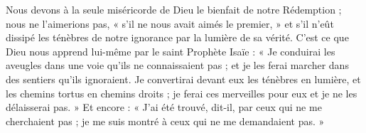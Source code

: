Nous devons à la seule miséricorde de Dieu le bienfait de notre Rédemption ; nous ne l’aimerions pas, « s’il ne nous avait aimés le premier, » et s’il n’eût dissipé les ténèbres de notre ignorance par la lumière de sa vérité. C’est ce que Dieu nous apprend lui-même par le saint Prophète Isaïe : « Je conduirai les aveugles dans une voie qu’ils ne connaissaient pas ; et je les ferai marcher dans des sentiers qu’ils ignoraient. Je convertirai devant eux les ténèbres en lumière, et les chemins tortus en chemins droits ; je ferai ces merveilles pour eux et je ne les délaisserai pas. » Et encore : « J’ai été trouvé, dit-il, par ceux qui ne me cherchaient pas ; je me suis montré à ceux qui ne me demandaient pas. »